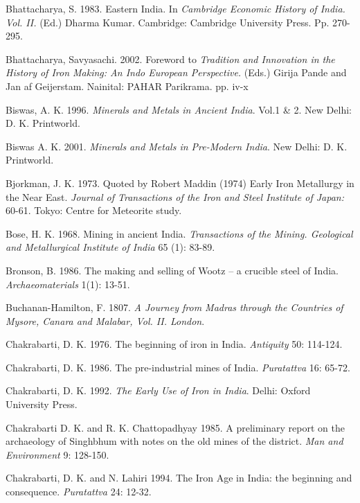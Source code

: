 \begin{thebibliography}{99}
 Bhattacharya, S. 1983. Eastern India. In \textit{Cambridge Economic History of India. Vol. II.} (Ed.) Dharma Kumar. Cambridge: Cambridge University Press. Pp. 270-295.

 Bhattacharya, Savyasachi. 2002. Foreword to \textit{Tradition and Innovation in the History of Iron Making: An Indo European Perspective.} (Eds.) Girija Pande and Jan af Geijerstam. Nainital: PAHAR Parikrama. pp. iv-x

 Biswas, A. K. 1996. \textit{Minerals and Metals in Ancient India}. Vol.1 \& 2. New Delhi: D. K. Printworld. 

 Biswas A. K. 2001. \textit{Minerals and Metals in Pre-Modern India}. New Delhi: D. K. Printworld.

 Bjorkman, J. K. 1973. Quoted by Robert Maddin (1974) Early Iron Metallurgy in the Near East. \textit{Journal of Transactions of the Iron and Steel Institute of Japan:} 60-61. Tokyo: Centre for Meteorite study. 

 Bose, H. K. 1968. Mining in ancient India. \textit{Transactions of the Mining. Geological and Metallurgical Institute of India} 65 (1): 83-89.

 Bronson, B. 1986. The making and selling of Wootz – a crucible steel of India. \textit{Archaeomaterials} 1(1): 13-51.

 Buchanan-Hamilton, F. 1807. \textit{A Journey from Madras through the Countries of Mysore, Canara and Malabar, Vol. II. London}.

 Chakrabarti, D. K. 1976. The beginning of iron in India. \textit{Antiquity} 50: 114-124.

 Chakrabarti, D. K. 1986. The pre-industrial mines of India. \textit{Puratattva} 16: 65-72. 

 Chakrabarti, D. K. 1992. \textit{The Early Use of Iron in India}. Delhi: Oxford University Press. 

 Chakrabarti D. K. and R. K. Chattopadhyay 1985. A preliminary report on the archaeology of Singhbhum with notes on the old mines of the district. \textit{Man and Environment} 9: 128-150.

 Chakrabarti, D. K. and N. Lahiri 1994. The Iron Age in India: the beginning and consequence. \textit{Puratattva} 24: 12-32.


\end{thebibliography}
